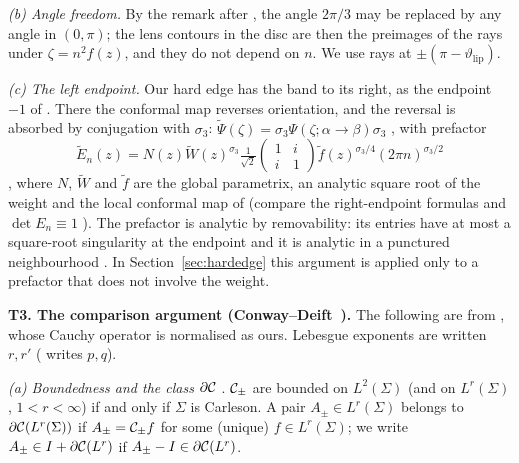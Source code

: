 \emph{(b) Angle freedom.} By the remark after \cite[(6.21)]{KMVV}, the angle $2\pi/3$ may be replaced by any angle in
$(0,\pi)$; the lens contours in the disc are then the preimages of the rays under $\zeta=n^2f(z)$, and they do not
depend on $n$. We use rays at $\pm(\pi-\vartheta_{\mathrm{lip}})$.

\emph{(c) The left endpoint.} Our hard edge has the band to its right, as the endpoint $-1$ of \cite{KMVV}. There the
conformal map reverses orientation, and the reversal is absorbed by conjugation with $\sigma_3$:
$\tilde\Psi(\zeta)=\sigma_3\Psi(\zeta;\alpha\to\beta)\sigma_3$ \cite[(6.51)]{KMVV}, with prefactor
\[
  \tilde E_n(z)=N(z)\tilde W(z)^{\sigma_3}\tfrac1{\sqrt2}\begin{pmatrix}1&i\\i&1\end{pmatrix}
  \tilde f(z)^{\sigma_3/4}(2\pi n)^{\sigma_3/2}
\]
\cite[(6.53)]{KMVV}, where $N$, $\tilde W$ and $\tilde f$ are the global parametrix, an analytic square root of the
weight and the local conformal map of \cite{KMVV} (compare the right-endpoint formulas
\cite[(6.27), (6.31)]{KMVV} and $\det E_n\equiv1$ \cite[(6.33)]{KMVV}). The prefactor is analytic by removability: its
entries have at most a square-root singularity at the endpoint and it is analytic in a punctured neighbourhood
\cite[proof of Proposition~6.5]{KMVV}. In Section~\ref{sec:hardedge} this argument is applied only to a prefactor
that does not involve the weight.

\medskip
\noindent\textbf{T3. The comparison argument (Conway--Deift~\cite{CD}).}
The following are from \cite[\S4]{CD}, whose Cauchy operator is normalised as ours. Lebesgue exponents are written
$r,r'$ (\cite{CD} writes $p,q$).

\emph{(a) Boundedness and the class $\partial\mathcal{C}$} \cite[\S4.1]{CD}. $\mathcal{C}_\pm$ are bounded on $L^2(\Sigma)$ (and on
$L^r(\Sigma)$, $1<r<\infty$) if and only if $\Sigma$ is Carleson. A pair $A_\pm\in L^r(\Sigma)$ belongs to
$\partial\mathcal{C}(L^r(\Sigma))$ if $A_\pm=\mathcal{C}_\pm f$ for some (unique) $f\in L^r(\Sigma)$; we write $A_\pm\in I+\partial\mathcal{C}(L^r)$ if
$A_\pm-I\in\partial\mathcal{C}(L^r)$.

